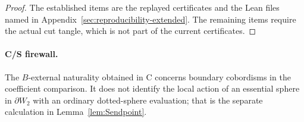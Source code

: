 \begin{proof}
The established items are the replayed certificates and the Lean files
named in Appendix~\ref{sec:reproducibility-extended}.  The remaining items
require the actual cut tangle, which is not part of the current
certificates.
\end{proof}

\paragraph{C/S firewall.}
The $B$-external naturality obtained in C concerns boundary cobordisms in
the coefficient comparison.  It does not identify the local action of an
essential sphere in $\partial W_2$ with an ordinary dotted-sphere evaluation;
that is the separate calculation in Lemma~\ref{lem:Sendpoint}.
